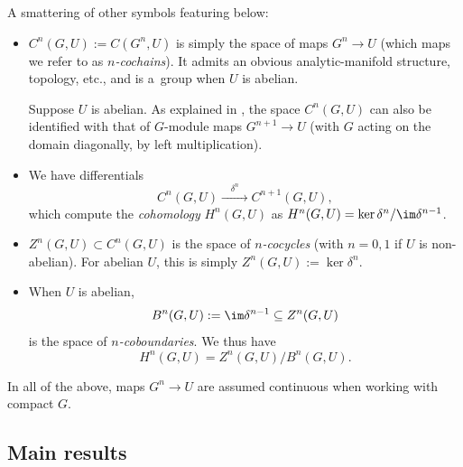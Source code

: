 A smattering of other symbols featuring below:
\begin{itemize}\itemsep=0pt
\item $C^n(G,U):=C(G^n,U)$ is simply the space of maps $G^n\to U$ (which maps we refer to as {\it $n$-cochains}). It admits an obvious analytic-manifold structure, topology, etc., and is a~group when $U$ is abelian.

 Suppose $U$ is abelian. As explained in \cite[Section~VII.3]{ser-lf}, the space $C^n(G,U)$ can also be identified with that of $G$-module maps $G^{n+1}\to U$ (with $G$ acting on the domain diagonally, by left multiplication).
\item We have differentials
\[C^n(G,U)\xrightarrow{\quad\delta^n\quad}C^{n+1}(G,U),\] which compute the {\it cohomology} $H^n(G,U)$ as $
 H^n(G,U) = \ker \delta^n/\im \delta^{n-1}$.

\item $Z^n(G,U)\subset C^n(G,U)$ is the space of {\it $n$-cocycles} (with $n=0,1$ if $U$ is non-abelian). For abelian $U$, this is simply $Z^n(G,U):=\ker \delta^n$.
\item When $U$ is abelian,
 \begin{equation*}
 B^n(G,U):=\im\delta^{n-1}\subseteq Z^n(G,U)
 \end{equation*}
 is the space of {\it $n$-coboundaries}. We thus have
 \begin{equation*}
 H^n(G,U) = Z^n(G,U)/B^n(G,U).
 \end{equation*}
\end{itemize}
In all of the above, maps $G^n\to U$ are assumed continuous when working with compact $G$.

\subsection{Main results}\label{subse:gpmain}

